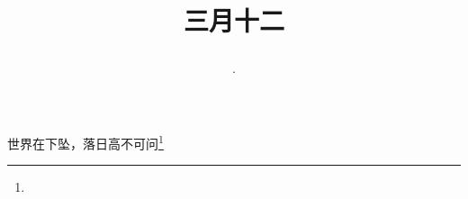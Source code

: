 \title{\date[d=20,m=4,y=2024][year:cn-y,年,month:cn,day:cn,日,·,weekday]·三月十二 }
世界在下坠，落日高不可问\footnote{ }

